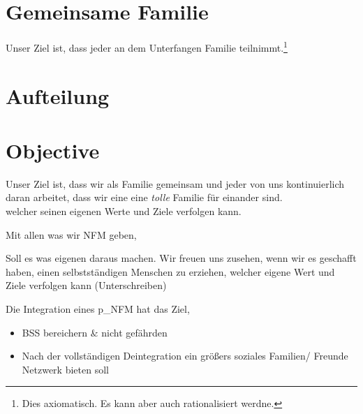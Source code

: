 \begin{itemize}
\section{Gemeinsame Familie}
Unser Ziel ist, dass jeder an dem Unterfangen Familie teilnimmt.\footnote{Dies axiomatisch. Es kann aber auch rationalisiert werdne.} 






\section{Aufteilung}

\section{Objective} \label{part:NFM_sec:Objective}

Unser Ziel ist, dass wir als Familie gemeinsam und jeder von uns kontinuierlich daran arbeitet, dass wir eine eine \textit{tolle} Familie für einander sind.\\ 










welcher seinen eigenen Werte und Ziele verfolgen kann.

Mit allen was wir NFM geben, 


Soll es was eigenen daraus machen. 
Wir freuen uns zusehen, wenn wir es geschafft haben, einen selbstständigen Menschen zu erziehen, welcher eigene Wert und Ziele verfolgen kann (Unterschreiben)	

Die Integration eines \gls{p_NFM} hat das Ziel, 
\begin{itemize}
	\item BSS bereichern $\&$ nicht gefährden
	\item Nach der vollständigen Deintegration ein größers soziales Familien/ Freunde Netzwerk bieten soll
\end{itemize}


\end{itemize}
